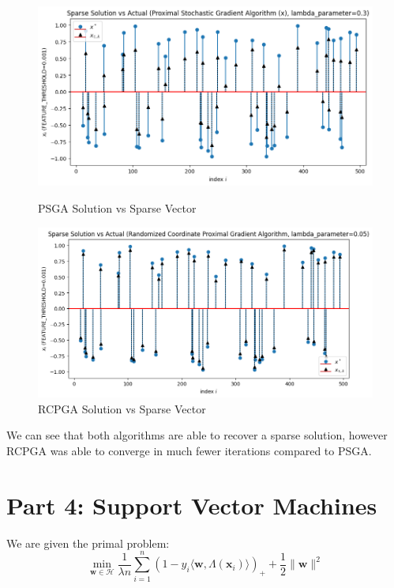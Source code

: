 \documentclass[12pt]{article}
\begin{document}
\begin{figure}[h]
\centering
\begin{minipage}{.5\textwidth}
  \centering
\includegraphics[scale=0.35]{outputs/part_3/psga-x}
\caption{PSGA Solution vs Sparse Vector}
\label{fig:}
\end{minipage}%
\begin{minipage}{.5\textwidth}
  \centering
\includegraphics[scale=0.35]{outputs/part_3/rcpga-x}
\caption{RCPGA Solution vs Sparse Vector}
\label{fig:}
\end{minipage}
\end{figure}

We can see that both algorithms are able to recover a sparse solution, however RCPGA was able to converge in much fewer iterations compared to PSGA.

\newpage
\section*{Part 4: Support Vector Machines}

We are given the primal problem:
\[\min_{\textbf{w} \in \mathcal{H}} \frac{1}{\lambda n} \sum_{i=1}^{n} (1-y_i \langle \textbf{w}, \Lambda(\textbf{x}_i)\rangle)_{+} + \frac{1}{2}\| \textbf{w}\|^2\]
\end{document}

